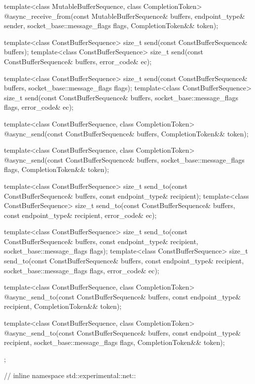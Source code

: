 \begin{codeblock}
{{    template<class MutableBufferSequence, class CompletionToken>
      @\DEDUCED@ async_receive_from(const MutableBufferSequence& buffers,
                                 endpoint_type& sender,
                                 socket_base::message_flags flags,
                                 CompletionToken&& token);

    template<class ConstBufferSequence>
      size_t send(const ConstBufferSequence& buffers);
    template<class ConstBufferSequence>
      size_t send(const ConstBufferSequence& buffers, error_code& ec);

    template<class ConstBufferSequence>
      size_t send(const ConstBufferSequence& buffers,
                  socket_base::message_flags flags);
    template<class ConstBufferSequence>
      size_t send(const ConstBufferSequence& buffers,
                  socket_base::message_flags flags, error_code& ec);

    template<class ConstBufferSequence, class CompletionToken>
      @\DEDUCED@ async_send(const ConstBufferSequence& buffers,
                         CompletionToken&& token);

    template<class ConstBufferSequence, class CompletionToken>
      @\DEDUCED@ async_send(const ConstBufferSequence& buffers,
                         socket_base::message_flags flags,
                         CompletionToken&& token);

    template<class ConstBufferSequence>
      size_t send_to(const ConstBufferSequence& buffers,
                     const endpoint_type& recipient);
    template<class ConstBufferSequence>
      size_t send_to(const ConstBufferSequence& buffers,
                     const endpoint_type& recipient, error_code& ec);

    template<class ConstBufferSequence>
      size_t send_to(const ConstBufferSequence& buffers,
                     const endpoint_type& recipient,
                     socket_base::message_flags flags);
    template<class ConstBufferSequence>
      size_t send_to(const ConstBufferSequence& buffers,
                     const endpoint_type& recipient,
                     socket_base::message_flags flags, error_code& ec);

    template<class ConstBufferSequence, class CompletionToken>
      @\DEDUCED@ async_send_to(const ConstBufferSequence& buffers,
                            const endpoint_type& recipient,
                            CompletionToken&& token);

    template<class ConstBufferSequence, class CompletionToken>
      @\DEDUCED@ async_send_to(const ConstBufferSequence& buffers,
                            const endpoint_type& recipient,
                            socket_base::message_flags flags,
                            CompletionToken&& token);
  };

} // inline namespace std::experimental::net::\namespacever
\end{codeblock}

